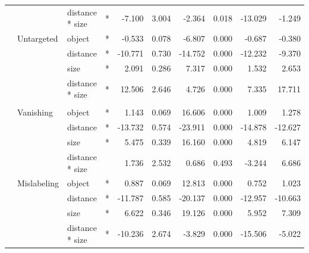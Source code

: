 \begin{longtable}[t]{llllrrrrrr}
\cmidrule{3-10}\nopagebreak
\hspace{1em} &  & distance * size & * & -7.100 & 3.004 & -2.364 & 0.018 & -13.029 & -1.249\\
\cmidrule{2-10}\nopagebreak
\hspace{1em} & Untargeted & object & * & -0.533 & 0.078 & -6.807 & 0.000 & -0.687 & -0.380\\
\cmidrule{3-10}\nopagebreak
\hspace{1em} &  & distance & * & -10.771 & 0.730 & -14.752 & 0.000 & -12.232 & -9.370\\
\cmidrule{3-10}\nopagebreak
\hspace{1em} &  & size & * & 2.091 & 0.286 & 7.317 & 0.000 & 1.532 & 2.653\\
\cmidrule{3-10}\nopagebreak
\hspace{1em} &  & distance * size & * & 12.506 & 2.646 & 4.726 & 0.000 & 7.335 & 17.711\\
\cmidrule{1-10}\pagebreak[0]
\addlinespace[0.3em]
\multicolumn{10}{l}{\textbf{SSD}}\\
\hspace{1em} & Vanishing & object & * & 1.143 & 0.069 & 16.606 & 0.000 & 1.009 & 1.278\\
\cmidrule{3-10}\nopagebreak
\hspace{1em} &  & distance & * & -13.732 & 0.574 & -23.911 & 0.000 & -14.878 & -12.627\\
\cmidrule{3-10}\nopagebreak
\hspace{1em} &  & size & * & 5.475 & 0.339 & 16.160 & 0.000 & 4.819 & 6.147\\
\cmidrule{3-10}\nopagebreak
\hspace{1em} &  & distance * size &  & 1.736 & 2.532 & 0.686 & 0.493 & -3.244 & 6.686\\
\cmidrule{2-10}\nopagebreak
\hspace{1em} & Mislabeling & object & * & 0.887 & 0.069 & 12.813 & 0.000 & 0.752 & 1.023\\
\cmidrule{3-10}\nopagebreak
\hspace{1em} &  & distance & * & -11.787 & 0.585 & -20.137 & 0.000 & -12.957 & -10.663\\
\cmidrule{3-10}\nopagebreak
\hspace{1em} &  & size & * & 6.622 & 0.346 & 19.126 & 0.000 & 5.952 & 7.309\\
\cmidrule{3-10}\nopagebreak
\hspace{1em} &  & distance * size & * & -10.236 & 2.674 & -3.829 & 0.000 & -15.506 & -5.022\\

\end{longtable}
